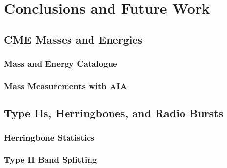 
\singlespacing
\chapter{Conclusions and Future Work} 
\label{chap:6}

\doublespacing
\section{CME Masses and Energies}
\subsection{Mass and Energy Catalogue}
\subsection{Mass Measurements with AIA}

\section{Type IIs, Herringbones, and Radio Bursts}
\subsection{Herringbone Statistics}
\subsection{Type II Band Splitting}
